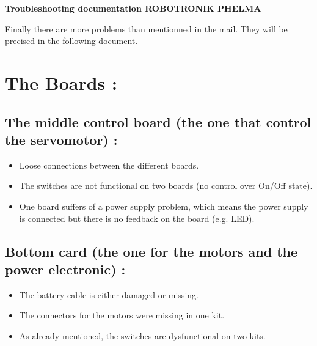 \documentclass[12pt]{report}
\begin{document}
\begin{center}
\Large\textbf{Troubleshooting documentation ROBOTRONIK PHELMA}\normalsize\\
\end{center}
\vspace*{0.5cm}
Finally there are more problems than mentionned in the mail. They will be precised in the following document.


\section*{The Boards :}
\subsection*{The middle control board (the one that control the servomotor) :}
\begin{itemize}
	\item Loose connections between the different boards.
	\item The switches are not functional on two boards (no control over On/Off state).
	\item One board suffers of a power supply problem, which means the power supply is connected but there is no feedback on the board (e.g. LED).
\end{itemize}

\subsection*{Bottom card (the one for the motors and the power electronic) :}
\begin{itemize}
	\item The battery cable is either damaged or missing.
	\item The connectors for the motors were missing in one kit.
	\item As already mentioned, the switches are dysfunctional on two kits.
\end{itemize}
\end{document}
